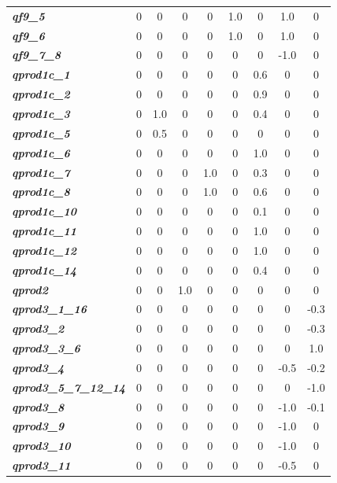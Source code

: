 \documentclass[a4paper,11pt]{article}
\begin{document}
\begin{table}[H]
\begin{center}
{\begin{tabular}{|l|c|c|c|c|c|c|c|c|}
    \textit{\textbf{qf9\_5}} & 0 & 0 & 0 & 0 & 1.0 & 0 & 1.0 & 0 \\
    \textit{\textbf{qf9\_6}} & 0 & 0 & 0 & 0 & 1.0 & 0 & 1.0 & 0 \\
    \textit{\textbf{qf9\_7\_8}} & 0 & 0 & 0 & 0 & 0 & 0 & -1.0 & 0 \\
    \textit{\textbf{qprod1c\_1}} & 0 & 0 & 0 & 0 & 0 & 0.6 & 0 & 0 \\
    \textit{\textbf{qprod1c\_2}} & 0 & 0 & 0 & 0 & 0 & 0.9 & 0 & 0 \\
    \textit{\textbf{qprod1c\_3}} & 0 & 1.0 & 0 & 0 & 0 & 0.4 & 0 & 0 \\
    \textit{\textbf{qprod1c\_5}} & 0 & 0.5 & 0 & 0 & 0 & 0 & 0 & 0 \\
    \textit{\textbf{qprod1c\_6}} & 0 & 0 & 0 & 0 & 0 & 1.0 & 0 & 0 \\
    \textit{\textbf{qprod1c\_7}} & 0 & 0 & 0 & 1.0 & 0 & 0.3 & 0 & 0 \\
    \textit{\textbf{qprod1c\_8}} & 0 & 0 & 0 & 1.0 & 0 & 0.6 & 0 & 0 \\
    \textit{\textbf{qprod1c\_10}} & 0 & 0 & 0 & 0 & 0 & 0.1 & 0 & 0 \\
    \textit{\textbf{qprod1c\_11}} & 0 & 0 & 0 & 0 & 0 & 1.0 & 0 & 0 \\
    \textit{\textbf{qprod1c\_12}} & 0 & 0 & 0 & 0 & 0 & 1.0 & 0 & 0 \\
    \textit{\textbf{qprod1c\_14}} & 0 & 0 & 0 & 0 & 0 & 0.4 & 0 & 0 \\
    \textit{\textbf{qprod2}} & 0 & 0 & 1.0 & 0 & 0 & 0 & 0 & 0 \\
    \textit{\textbf{qprod3\_1\_16}} & 0 & 0 & 0 & 0 & 0 & 0 & 0 & -0.3 \\
    \textit{\textbf{qprod3\_2}} & 0 & 0 & 0 & 0 & 0 & 0 & 0 & -0.3 \\
    \textit{\textbf{qprod3\_3\_6}} & 0 & 0 & 0 & 0 & 0 & 0 & 0 & 1.0 \\
    \textit{\textbf{qprod3\_4}} & 0 & 0 & 0 & 0 & 0 & 0 & -0.5 & -0.2 \\
    \textit{\textbf{qprod3\_5\_7\_12\_14}} & 0 & 0 & 0 & 0 & 0 & 0 & 0 & -1.0 \\
    \textit{\textbf{qprod3\_8}} & 0 & 0 & 0 & 0 & 0 & 0 & -1.0 & -0.1 \\
    \textit{\textbf{qprod3\_9}} & 0 & 0 & 0 & 0 & 0 & 0 & -1.0 & 0 \\
    \textit{\textbf{qprod3\_10}} & 0 & 0 & 0 & 0 & 0 & 0 & -1.0 & 0 \\
    \textit{\textbf{qprod3\_11}} & 0 & 0 & 0 & 0 & 0 & 0 & -0.5 & 0 \\

\end{tabular}}
\end{center}
\end{table}
\end{document}
